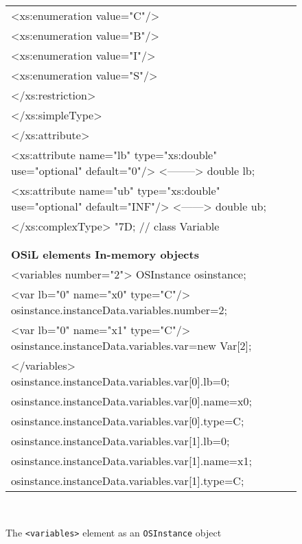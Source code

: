 \documentclass[11pt]{article}
\newcommand{\Sa}{8pt}
\newcommand{\Sb}{0pt}
\renewcommand{\_}{{\char"5F}}
\renewcommand{\{}{{\char"7B}}
\renewcommand{\}}{{\char"7D}}
\renewcommand{\^}{{\char"0D}}
\renewcommand{\'}{{\char"0D}}
\begin{document}
\begin{figure}[hb]
{{\begin{tabular}{@{}l@{}}
        <xs:enumeration value="C"/>\\[\Sb]
        <xs:enumeration value="B"/>\\[\Sb]
        <xs:enumeration value="I"/>\\[\Sb]
        <xs:enumeration value="S"/>\\[\Sb]
      </xs:restriction>\\[\Sb]
    </xs:simpleType>\\[\Sb]
  </xs:attribute>\\[\Sb]
  <xs:attribute name="lb" type="xs:double" use="optional" default="0"/>  <-------->    double lb;\\[\Sb]
  <xs:attribute name="ub" type="xs:double" use="optional" default="INF"/>  <------>    double ub;\\[\Sb]
</xs:complexType>                                                                    \}; // class Variable\\[\Sb]
 \\[\Sb]
 \\[\Sb]
\textsf{\textbf{OSiL elements          \hspace{2.07in}  In-memory objects}}\\[\Sa]
<variables number="2">                                  OSInstance osinstance;\\[\Sb]
   <var lb="0" name="x0" type="C"/>                     osinstance.instanceData.variables.number=2;\\[\Sb]
   <var lb="0" name="x1" type="C"/>                     osinstance.instanceData.variables.var=new Var[2];\\[\Sb]
</variables>                                            osinstance.instanceData.variables.var[0].lb=0;\\[\Sb]
                                                        osinstance.instanceData.variables.var[0].name=x0;\\[\Sb]
                                                        osinstance.instanceData.variables.var[0].type=C;\\[\Sb]
                                                        osinstance.instanceData.variables.var[1].lb=0;\\[\Sb]
                                                        osinstance.instanceData.variables.var[1].name=x1;\\[\Sb]
                                                        osinstance.instanceData.variables.var[1].type=C;
\end{tabular} }} \medskip\\[\Sb]
\caption{The {\tt <variables>} element as an {\tt OSInstance} object} \label{figure:osinstancevariables}
\end{figure}
\end{document}
